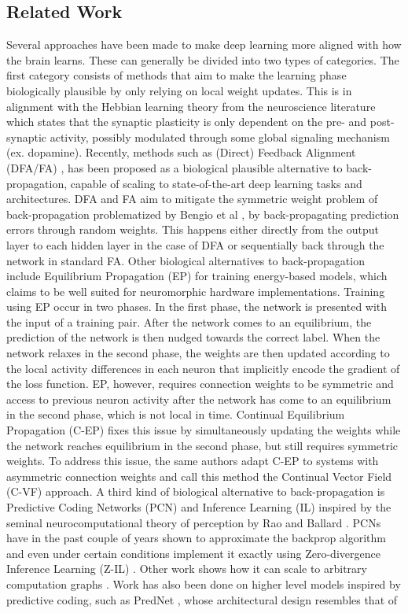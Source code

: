 \documentclass[a4paper,11pt]{article}
\begin{document}
\subsection{Related Work}
Several approaches have been made to make deep learning more aligned with how the brain learns. These can generally be divided into two types of categories. The first category consists of methods that aim to make the learning phase biologically plausible by only relying on local weight updates. This is in alignment with the Hebbian learning theory \cite{hebb1949} from the neuroscience literature which states that the synaptic plasticity is only dependent on the pre- and post-synaptic activity, possibly modulated through some global signaling mechanism (ex. dopamine). Recently, methods such as (Direct) Feedback Alignment (DFA/FA) \cite{noekland2016direct} \cite{lillicrap2014random}, has been proposed as a biological plausible alternative to back-propagation, capable of scaling to state-of-the-art deep learning tasks and architectures. DFA and FA aim to mitigate the symmetric weight problem of back-propagation problematized by Bengio et al \cite{BengioLBL15}, by back-propagating prediction errors through random weights. This happens either directly from the output layer to each hidden layer in the case of DFA or sequentially back through the network in standard FA. Other biological alternatives to back-propagation include Equilibrium Propagation (EP) \cite{EqProp} for training energy-based models, which claims to be well suited for neuromorphic hardware implementations. Training using EP occur in two phases. In the first phase, the network is presented with the input of a training pair. After the network comes to an equilibrium, the prediction of the network is then nudged towards the correct label. When the network relaxes in the second phase, the weights are then updated according to the local activity differences in each neuron that implicitly encode the gradient of the loss function. EP, however, requires connection weights to be symmetric and access to previous neuron activity after the network has come to an equilibrium in the second phase, which is not local in time. Continual Equilibrium Propagation (C-EP) \cite{ContinualEqProp} fixes this issue by simultaneously updating the weights while the network reaches equilibrium in the second phase, but still requires symmetric weights. To address this issue, the same authors adapt C-EP to systems with asymmetric connection weights and call this method the Continual Vector Field (C-VF) approach. A third kind of biological alternative to back-propagation is Predictive Coding Networks (PCN) and Inference Learning (IL) \cite{predcoding} inspired by the seminal neurocomputational theory of perception by Rao and Ballard \cite{raoballard1999}. PCNs have in the past couple of years shown to approximate the backprop algorithm and even under certain conditions implement it exactly using Zero-divergence Inference Learning (Z-IL) \cite{PredictiveCodingNetworks}. Other work shows how it can scale to arbitrary computation graphs \cite{salvatori2021reverse} \cite{milladge2020predictive}. Work has also been done on higher level models inspired by predictive coding, such as PredNet \cite{lotter-prednet}, whose architectural design resembles that of 
\end{document}
